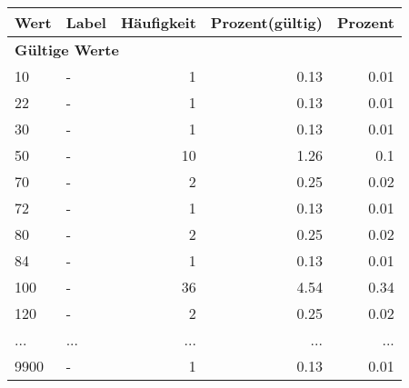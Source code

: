      \begin{longtable}{lXrrr}
     \toprule
     \textbf{Wert} & \textbf{Label} & \textbf{Häufigkeit} & \textbf{Prozent(gültig)} & \textbf{Prozent} \\
     \endhead
     \midrule
     \multicolumn{5}{l}{\textbf{Gültige Werte}}\\
        10 & \multicolumn{1}{X}{-} & %
          \num{1} &
          \num[round-mode=places,round-precision=2]{0.13} &
          \num[round-mode=places,round-precision=2]{0.01} \\
        22 & \multicolumn{1}{X}{-} & %
          \num{1} &
          \num[round-mode=places,round-precision=2]{0.13} &
          \num[round-mode=places,round-precision=2]{0.01} \\
        30 & \multicolumn{1}{X}{-} & %
          \num{1} &
          \num[round-mode=places,round-precision=2]{0.13} &
          \num[round-mode=places,round-precision=2]{0.01} \\
        50 & \multicolumn{1}{X}{-} & %
          \num{10} &
          \num[round-mode=places,round-precision=2]{1.26} &
          \num[round-mode=places,round-precision=2]{0.1} \\
        70 & \multicolumn{1}{X}{-} & %
          \num{2} &
          \num[round-mode=places,round-precision=2]{0.25} &
          \num[round-mode=places,round-precision=2]{0.02} \\
        72 & \multicolumn{1}{X}{-} & %
          \num{1} &
          \num[round-mode=places,round-precision=2]{0.13} &
          \num[round-mode=places,round-precision=2]{0.01} \\
        80 & \multicolumn{1}{X}{-} & %
          \num{2} &
          \num[round-mode=places,round-precision=2]{0.25} &
          \num[round-mode=places,round-precision=2]{0.02} \\
        84 & \multicolumn{1}{X}{-} & %
          \num{1} &
          \num[round-mode=places,round-precision=2]{0.13} &
          \num[round-mode=places,round-precision=2]{0.01} \\
        100 & \multicolumn{1}{X}{-} & %
          \num{36} &
          \num[round-mode=places,round-precision=2]{4.54} &
          \num[round-mode=places,round-precision=2]{0.34} \\
        120 & \multicolumn{1}{X}{-} & %
          \num{2} &
          \num[round-mode=places,round-precision=2]{0.25} &
          \num[round-mode=places,round-precision=2]{0.02} \\
       ... & ... & ... & ... & ... \\
        9900 & \multicolumn{1}{X}{-} & %
          \num{1} &
          \num[round-mode=places,round-precision=2]{0.13} &
          \num[round-mode=places,round-precision=2]{0.01} \\


\end{longtable}
